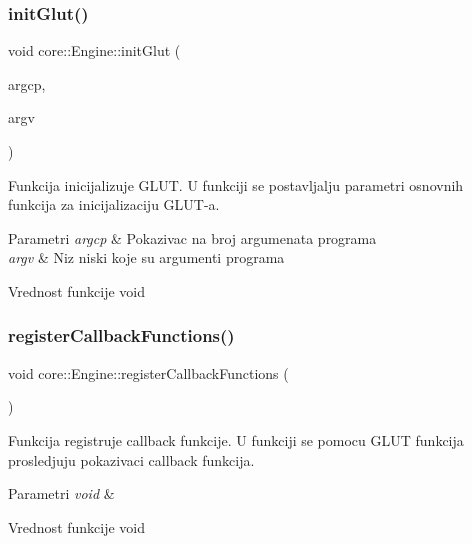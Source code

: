 \subsubsection{\texorpdfstring{init\+Glut()}{initGlut()}}
{\footnotesize\ttfamily void core\+::\+Engine\+::init\+Glut (\begin{DoxyParamCaption}\item[{int $\ast$}]{argcp,  }\item[{char $\ast$$\ast$}]{argv }\end{DoxyParamCaption})\hspace{0.3cm}{\ttfamily [private]}}



Funkcija inicijalizuje G\+L\+UT. U funkciji se postavljalju parametri osnovnih funkcija za inicijalizaciju G\+L\+U\+T-\/a. 


\begin{DoxyParams}{Parametri}
{\em argcp} & Pokazivac na broj argumenata programa \\
\hline
{\em argv} & Niz niski koje su argumenti programa \\
\hline
\end{DoxyParams}
\begin{DoxyReturn}{Vrednost funkcije}
void 
\end{DoxyReturn}
\mbox{\label{classcore_1_1Engine_a4a8c96ce1172195507d2233479837ad2}} 
\subsubsection{\texorpdfstring{register\+Callback\+Functions()}{registerCallbackFunctions()}}
{\footnotesize\ttfamily void core\+::\+Engine\+::register\+Callback\+Functions (\begin{DoxyParamCaption}\item[{void}]{ }\end{DoxyParamCaption})\hspace{0.3cm}{\ttfamily [private]}}



Funkcija registruje callback funkcije. U funkciji se pomocu G\+L\+UT funkcija prosledjuju pokazivaci callback funkcija. 


\begin{DoxyParams}{Parametri}
{\em void} & \\
\hline
\end{DoxyParams}
\begin{DoxyReturn}{Vrednost funkcije}
void 
\end{DoxyReturn}
\mbox{\label{classcore_1_1Engine_ac0cb11890396ccdf5100bc73045c4d38}} 
